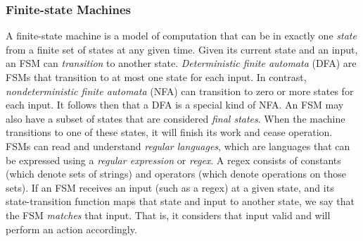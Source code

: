 \subsubsection{Finite-state Machines}

A finite-state machine is a model of computation that can be in exactly one \textit{state} from a finite set of states at any given time. Given its current state and an input, an FSM can \textit{transition} to another state. \textit{Deterministic finite automata} (DFA) are FSMs that transition to at most one state for each input. In contrast, \textit{nondeterministic finite automata} (NFA) can transition to zero or more states for each input. It follows then that a DFA is a special kind of NFA. An FSM may also have a subset of states that are considered \textit{final states}. When the machine transitions to one of these states, it will finish its work and cease operation. \\

FSMs can read and understand \textit{regular languages}, which are languages that can be expressed using a \textit{regular expression} or \textit{regex}. A regex consists of constants (which denote sets of strings) and operators (which denote operations on those sets). If an FSM receives an input (such as a regex) at a given state, and its state-transition function maps that state and input to another state, we say that the FSM \textit{matches} that input. That is, it considers that input valid and will perform an action accordingly. \\\\

